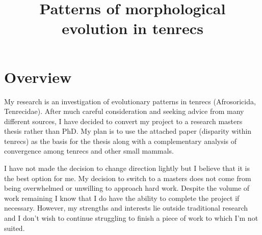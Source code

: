 \documentclass[12pt,a4paper]{article}
\begin{document}
\title{Patterns of morphological evolution in tenrecs}
\author{}
\date{}
\maketitle


\renewcommand{\headrulewidth}{0.0pt}
\thispagestyle{fancy}				%
\chead{}


\section{Overview}%



	

	My research is an investigation of evolutionary patterns in tenrecs (Afrosoricida,  Tenrecidae). After much careful consideration and seeking advice from many different sources, I have decided to convert my project to a research masters thesis rather than PhD. My plan is to use the attached paper (disparity within tenrecs) as the basis for the thesis along with a complementary analysis of convergence among tenrecs and other small mammals. 
	
	I have not made the decision to change direction lightly but I believe that it is the best option for me. My decision to switch to a masters does not come from being overwhelmed or unwilling to approach hard work. Despite the volume of work remaining I know that I do have the ability to complete the project if necessary. However, my strengths and interests lie outside traditional research and I don't wish to continue struggling to finish a piece of work to which I'm not suited.
	
\end{document}
